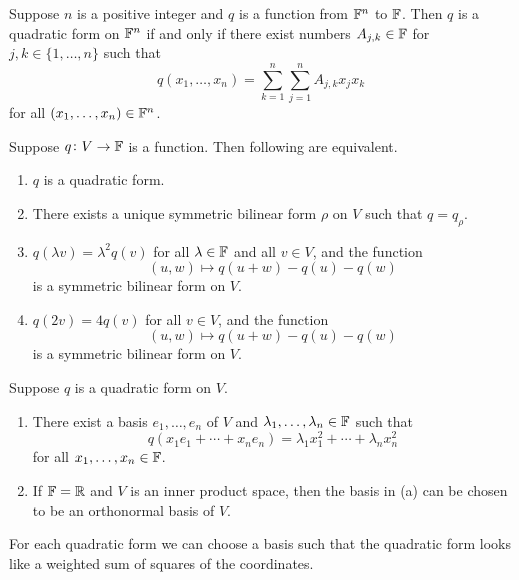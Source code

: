 \documentclass{extarticle}
\begin{document}
\begin{corollary}
    Suppose \(n\) is a positive integer and \(q\) is a function from \(\mathbb{F}^n\) to \(\mathbb{F}\). Then \(q\) is a 
    quadratic form on \(\mathbb{F}^n\) if and only if there exist numbers \(A_{j, k} \in \mathbb{F}\) for \(j, k \in \{1, \ldots, n\}\)
    such that 
    \[q(x_1, \ldots, x_n)  = \sum_{k=1}^{n} \sum_{j=1}^{n} A_{j, k} x_j x_k\]
    for all \((x_1, \ldots, x_n) \in \mathbb{F}^n\). 
\end{corollary}


\begin{thm}
    Suppose \(q \colon V \to \mathbb{F}\) is a function. Then following are equivalent. 
    \begin{enumerate}[label=(\alph*)]
        \item \(q\) is a quadratic form. 
        \item There exists a unique symmetric bilinear form \(\rho\) on \(V\) such that \(q = q_\rho\). 
        \item \(q(\lambda v) = \lambda^2 q(v)\) for all \(\lambda \in \mathbb{F}\) and all \(v \in V\), and the function 
        \[(u, w) \mapsto q(u + w) - q(u) - q(w)\]
        is a symmetric bilinear form on \(V\). 

        \item \(q(2v) = 4 q(v)\) for all \(v \in V\), and the function 
        \[(u, w) \mapsto q(u + w) - q(u) - q(w)\]
        is a symmetric bilinear form on \(V\). 
    \end{enumerate}
\end{thm}


\begin{thm}
    Suppose \(q\) is a quadratic form on \(V\). 
    \begin{enumerate}[label=(\alph*)]
        \item There exist a basis \(e_1, \ldots, e_n\) of \(V\) and \(\lambda_1, \ldots, \lambda_n \in \mathbb{F}\) 
        such that 
        \[q(x_1 e_1 + \cdots + x_n e_n) = \lambda_1 x_1^2 + \cdots + \lambda_n x_n^2\]
        for all \(x_1, \ldots, x_n \in \mathbb{F}\). 

        \item If \(\mathbb{F} = \mathbb{R}\) and \(V\) is an inner product space, then the basis in (a) can be chosen to be 
        an orthonormal basis of \(V\). 
    \end{enumerate}
\end{thm}

\begin{remark}
    For each quadratic form we can choose a basis such that the quadratic form looks like a weighted sum of 
    squares of the coordinates. 
\end{remark}
\end{document}

